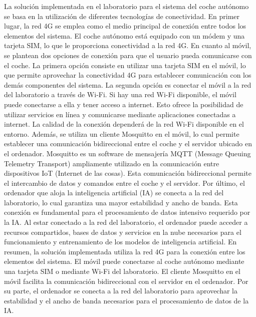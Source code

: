 La solución implementada en el laboratorio para el sistema del coche autónomo se basa en la utilización de diferentes tecnologías de conectividad. En primer lugar, la red 4G se emplea como el medio principal de conexión entre todos los elementos del sistema. El coche autónomo está equipado con un módem y una tarjeta SIM, lo que le proporciona conectividad a la red 4G.
En cuanto al móvil, se plantean dos opciones de conexión para que el usuario pueda comunicarse con el coche. La primera opción consiste en utilizar una tarjeta SIM en el móvil, lo que permite aprovechar la conectividad 4G para establecer comunicación con los demás componentes del sistema. La segunda opción es conectar el móvil a la red del laboratorio a través de Wi-Fi. Si hay una red Wi-Fi disponible, el móvil puede conectarse a ella y tener acceso a internet. Esto ofrece la posibilidad de utilizar servicios en línea y comunicarse mediante aplicaciones conectadas a internet. La calidad de la conexión dependerá de la red Wi-Fi disponible en el entorno.
Además, se utiliza un cliente Mosquitto en el móvil, lo cual permite establecer una comunicación bidireccional entre el coche y el servidor ubicado en el ordenador. Mosquitto es un software de mensajería MQTT (Message Queuing Telemetry Transport) ampliamente utilizado en la comunicación entre dispositivos IoT (Internet de las cosas). Esta comunicación bidireccional permite el intercambio de datos y comandos entre el coche y el servidor.
Por último, el ordenador que aloja la inteligencia artificial (IA) se conecta a la red del laboratorio, lo cual garantiza una mayor estabilidad y ancho de banda. Esta conexión es fundamental para el procesamiento de datos intensivo requerido por la IA. Al estar conectado a la red del laboratorio, el ordenador puede acceder a recursos compartidos, bases de datos y servicios en la nube necesarios para el funcionamiento y entrenamiento de los modelos de inteligencia artificial.
En resumen, la solución implementada utiliza la red 4G para la conexión entre los elementos del sistema. El móvil puede conectarse al coche autónomo mediante una tarjeta SIM o mediante Wi-Fi del laboratorio. El cliente Mosquitto en el móvil facilita la comunicación bidireccional con el servidor en el ordenador. Por su parte, el ordenador se conecta a la red del laboratorio para aprovechar la estabilidad y el ancho de banda necesarios para el procesamiento de datos de la IA.

